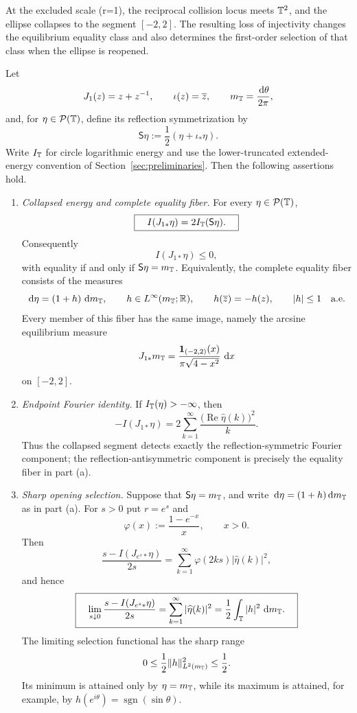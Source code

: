 At the excluded scale (r=1), the reciprocal collision locus meets
\(\mathbb{T}^2\), and the ellipse collapses to the segment \([-2,2]\).  The
resulting loss of injectivity changes the equilibrium equality class and
also determines the first-order selection of that class when the ellipse
is reopened.

\begin{theorem}\label{thm:collapsed-ellipse-opening-selection}
Let
\[
J_1(z)=z+z^{-1},\qquad \iota(z)=\overline z,
\qquad m_{\mathbb{T}}=\frac{\,\mathrm{d}\theta}{2\pi},
\]
and, for \(\eta\in\mathcal P(\mathbb{T})\), define its reflection
symmetrization by
\[
\mathsf S\eta:=\frac12(\eta+\iota_\ast\eta).
\]
Write \(I_{\mathbb{T}}\) for circle logarithmic energy and use the
lower-truncated extended-energy convention of
Section~\ref{sec:preliminaries}.  Then the following assertions hold.

\begin{enumerate}[label=\textup{(\alph*)},leftmargin=*]
\item \emph{Collapsed energy and complete equality fiber.}  For every
\(\eta\in\mathcal P(\mathbb{T})\),
\[
\boxed{\quad I(J_{1\ast}\eta)=2I_{\mathbb{T}}(\mathsf S\eta).\quad}
\]
Consequently
\[
I(J_{1\ast}\eta)\le 0,
\]
with equality if and only if \(\mathsf S\eta=m_{\mathbb{T}}\).  Equivalently,
the complete equality fiber consists of the measures
\[
\,\mathrm{d}\eta=(1+h)\,\,\mathrm{d} m_{\mathbb{T}},
\qquad h\in L^\infty(m_{\mathbb{T}};\mathbb{R}),
\qquad h(\overline z)=-h(z),
\qquad |h|\le1\quad\text{a.e.}
\]
Every member of this fiber has the same image, namely the arcsine
equilibrium measure
\[
J_{1\ast}m_{\mathbb{T}}
=\frac{\mathbf 1_{(-2,2)}(x)}{\pi\sqrt{4-x^2}}\,\,\mathrm{d} x
\]
on \([-2,2]\).

\item \emph{Endpoint Fourier identity.}  If
\(I_{\mathbb{T}}(\eta)>-\infty\), then
\[
-I(J_{1\ast}\eta)
=2\sum_{k=1}^{\infty}
\frac{\bigl(\operatorname{Re}\widehat\eta(k)\bigr)^2}{k}.
\]
Thus the collapsed segment detects exactly the reflection-symmetric
Fourier component; the reflection-antisymmetric component is precisely
the equality fiber in part \textup{(a)}.

\item \emph{Sharp opening selection.}  Suppose that
\(\mathsf S\eta=m_{\mathbb{T}}\), and write
\(\,\mathrm{d}\eta=(1+h)\,\mathrm{d} m_{\mathbb{T}}\) as in part \textup{(a)}.  For \(s>0\)
put \(r=e^s\) and
\[
\varphi(x):=\frac{1-e^{-x}}{x},\qquad x>0.
\]
Then
\[
\frac{s-I(J_{e^s\ast}\eta)}{2s}
=\sum_{k=1}^{\infty}\varphi(2ks)
\left|\widehat\eta(k)\right|^2,
\]
and hence
\[
\boxed{\quad
\lim_{s\downarrow0}
\frac{s-I(J_{e^s\ast}\eta)}{2s}
=\sum_{k=1}^{\infty}|\widehat\eta(k)|^2
=\frac12\int_{\mathbb{T}}|h|^2\,\,\mathrm{d} m_{\mathbb{T}}.
\quad}
\]
The limiting selection functional has the sharp range
\[
0\le \frac12\|h\|_{L^2(m_{\mathbb{T}})}^2\le\frac12.
\]
Its minimum is attained only by \(\eta=m_{\mathbb{T}}\), while its maximum is
attained, for example, by
\(h(e^{i\theta})=\operatorname{sgn}(\sin\theta)\).


\end{enumerate}
\end{theorem}
